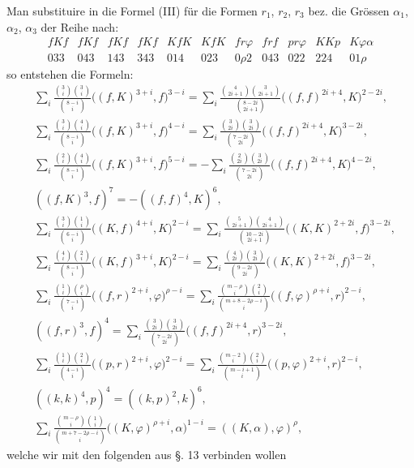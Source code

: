 \documentclass[10pt]{article}
\begin{document}
Man substituire in die Formel (III) für die Formen $r_1$, $r_2$, $r_3$ bez. die Grössen $\alpha_1$, $\alpha_2$, $\alpha_3$ der Reihe nach:
\[
\begin{array}{ccccccccccc}
fKf&fKf&fKf&fKf&KfK&KfK&fr\varphi&frf&pr\varphi&KKp&K\varphi\alpha\\
033&043&143&343&014&023&0\rho2&043&022&224&01\rho
\end{array}
\]
so entstehen die Formeln:
\begin{align*}
&\sum_i\frac{\binom{3}{i}\binom{3}{i}}{\binom{8-i}{i}}\bigl((f,K)^{3+i},f\bigr)^{3-i}
=\sum_i\frac{\binom{4}{2i+1}\binom{3}{2i+1}}{\binom{8-2i}{2i+1}}\bigl((f,f)^{2i+4},K\bigr)^{2-2i},\\
&\sum_i\frac{\binom{3}{i}\binom{4}{i}}{\binom{8-i}{i}}\bigl((f,K)^{3+i},f\bigr)^{4-i}
=\sum_i\frac{\binom{3}{2i}\binom{3}{2i}}{\binom{7-2i}{2i}}\bigl((f,f)^{2i+4},K\bigr)^{3-2i},\\
&\sum_i\frac{\binom{2}{i}\binom{4}{i}}{\binom{8-i}{i}}\bigl((f,K)^{3+i},f\bigr)^{5-i}
=-\sum_i\frac{\binom{2}{2i}\binom{3}{2i}}{\binom{7-2i}{2i}}\bigl((f,f)^{2i+4},K\bigr)^{4-2i},\\
&((f,K)^3,f)^7=-((f,f)^4,K)^6,\\
&\sum_i\frac{\binom{3}{i}\binom{1}{i}}{\binom{6-i}{i}}\bigl((K,f)^{4+i},K\bigr)^{2-i}
=\sum_i\frac{\binom{5}{2i+1}\binom{4}{2i+1}}{\binom{10-2i}{2i+1}}\bigl((K,K)^{2+2i},f\bigr)^{3-2i},\\
&\sum_i\frac{\binom{4}{i}\binom{2}{i}}{\binom{8-i}{i}}\bigl((K,f)^{3+i},K\bigr)^{2-i}
=\sum_i\frac{\binom{4}{2i}\binom{3}{2i}}{\binom{9-2i}{2i}}\bigl((K,K)^{2+2i},f\bigr)^{3-2i},\\
&\sum_i\frac{\binom{1}{i}\binom{\rho}{i}}{\binom{7-i}{i}}\bigl((f,r)^{2+i},\varphi\bigr)^{\rho-i}
=\sum_i\frac{\binom{m-\rho}{i}\binom{2}{i}}{\binom{m+8-2\rho-i}{i}}\bigl((f,\varphi)^{\rho+i},r\bigr)^{2-i},\\
&((f,r)^3,f)^4=\sum_i\frac{\binom{3}{2i}\binom{3}{2i}}{\binom{7-2i}{2i}}\bigl((f,f)^{2i+4},r\bigr)^{3-2i},\\
&\sum_i\frac{\binom{1}{i}\binom{2}{i}}{\binom{4-i}{i}}\bigl((p,r)^{2+i},\varphi\bigr)^{2-i}
=\sum_i\frac{\binom{m-2}{i}\binom{2}{i}}{\binom{m-i+1}{i}}\bigl((p,\varphi)^{2+i},r\bigr)^{2-i},\\
&((k,k)^4,p)^4=((k,p)^2,k)^6,\\
&\sum_i\frac{\binom{m-\rho}{i}\binom{1}{i}}{\binom{m+7-2\rho-i}{i}}\bigl((K,\varphi)^{\rho+i},\alpha\bigr)^{1-i}=((K,\alpha),\varphi)^\rho,
\end{align*}
welche wir mit den folgenden aus §. 13 verbinden wollen
\end{document}
